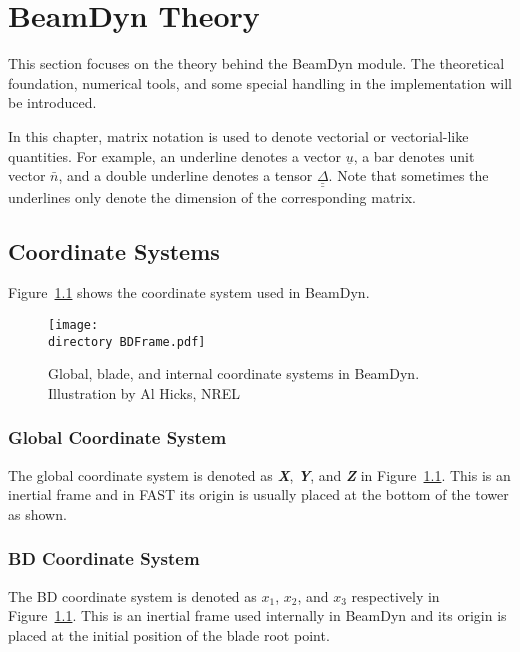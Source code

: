 \chapter{BeamDyn Theory}

This section focuses on the theory behind the BeamDyn module. 
The theoretical foundation, numerical tools, and some special handling in the implementation will be introduced. 


In this chapter, matrix notation is used to denote vectorial or vectorial-like quantities. 
For example, an underline denotes a vector $\underline{u}$, a bar denotes unit vector $\bar{n}$, and a double underline denotes a tensor $\underline{\underline{\Delta}}$. 
Note that sometimes the underlines only denote the dimension of the corresponding matrix.

\section{Coordinate Systems}
Figure~\ref{fig:BDFrame}  shows the coordinate system used in BeamDyn.
\begin{figure}[h!tp]
    \centering
    \texttt{[image: \\directory BDFrame.pdf]}
    \caption{Global, blade, and internal coordinate systems in BeamDyn. Illustration by Al Hicks, NREL}
    \label{fig:BDFrame}
\end{figure}

\subsection{Global Coordinate System}
The global coordinate system is denoted as \textbf{ {\it X}}, \textbf{ {\it Y}}, and \textbf{ {\it Z}} in Figure~\ref{fig:BDFrame}. 
This is an inertial frame and in FAST its origin is usually placed at the bottom of the tower as shown.

\subsection{BD Coordinate System}
The BD coordinate system is denoted as $x_1$, $x_2$, and $x_3$ respectively in Figure~\ref{fig:BDFrame}. 
This is an inertial frame used internally in BeamDyn and its origin is placed at the initial position of the blade root point.


